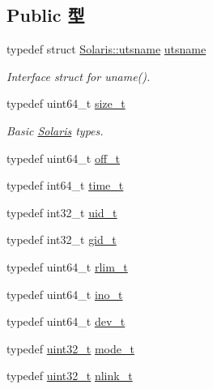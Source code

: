 \subsection*{Public 型}
\begin{DoxyCompactItemize}
\item 
typedef struct \hyperlink{structSolaris_1_1utsname}{Solaris::utsname} \hyperlink{classSolaris_a75007aec58bc064c3e3a0cadc7231f75}{utsname}
\begin{DoxyCompactList}\small\item\em Interface struct for uname(). \item\end{DoxyCompactList}\end{DoxyCompactItemize}
\begin{Indent}{\bf }\par
{\em \label{_amgrpd41d8cd98f00b204e9800998ecf8427e}
 }\begin{DoxyCompactItemize}
\item 
typedef uint64\_\-t \hyperlink{classSolaris_a186ea1339bffb378854987065835afe3}{size\_\-t}
\begin{DoxyCompactList}\small\item\em Basic \hyperlink{classSolaris}{Solaris} types. \item\end{DoxyCompactList}\item 
typedef uint64\_\-t \hyperlink{classSolaris_a2cb84cf5f02a29b7e8f237ff151a9225}{off\_\-t}
\item 
typedef int64\_\-t \hyperlink{classSolaris_a7f5991675a84025dc7c24754a9b257c0}{time\_\-t}
\item 
typedef int32\_\-t \hyperlink{classSolaris_a329afc5720e0f587c9082a0c7d8bc5ef}{uid\_\-t}
\item 
typedef int32\_\-t \hyperlink{classSolaris_ac82407e3c726eed1484fd769846106f4}{gid\_\-t}
\item 
typedef uint64\_\-t \hyperlink{classSolaris_a38a5c8082e90a1fee7994faa419a2718}{rlim\_\-t}
\item 
typedef uint64\_\-t \hyperlink{classSolaris_a05e26458c6a667897adbdb68b1ad6857}{ino\_\-t}
\item 
typedef uint64\_\-t \hyperlink{classSolaris_a25ab4acd63db23ce8ebc580b48d6c32f}{dev\_\-t}
\item 
typedef \hyperlink{Type_8hh_a435d1572bf3f880d55459d9805097f62}{uint32\_\-t} \hyperlink{classSolaris_af8f4385bb42836d1e3ad4fea9d71d1b9}{mode\_\-t}
\item 
typedef \hyperlink{Type_8hh_a435d1572bf3f880d55459d9805097f62}{uint32\_\-t} \hyperlink{classSolaris_a9e3c03dae15b90102eb1770dd95adadc}{nlink\_\-t}
\end{DoxyCompactItemize}
\end{Indent}
